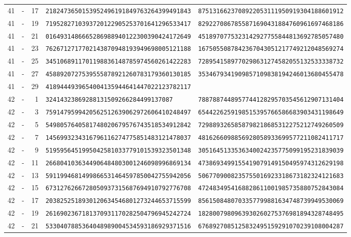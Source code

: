\begin{longtable}{@{}rcrll@{}}
41&-&17&\texttt{2182473650153952496191849763264399491843}&\texttt{8751316623708922053111950919304188601912}\\
41&-&19&\texttt{7195282710393720122905253701641296533417}&\texttt{8292270867855871690431884760961697468186}\\
41&-&21&\texttt{0164931486665286988940122300390424172649}&\texttt{4518970775323142927755844813692785057480}\\
41&-&23&\texttt{7626712717702143870948193949698005121188}&\texttt{1675055087842367043051217749212048569274}\\
41&-&25&\texttt{3451068911701198836148785974560261422283}&\texttt{7289541589770298631274582055132533338732}\\
41&-&27&\texttt{4588920727539555878921260783179360130185}&\texttt{3534679341909857109838194246013680455478}\\
41&-&29&\texttt{4189444939654004135944641447022123782117}&\texttt{}\\
42&-&1&\texttt{32414323869288131509266284499137087}&\texttt{7887887448957744128295703545612907131404}\\
42&-&3&\texttt{7591479599420562512639062972606410248497}&\texttt{6544226259198515395766586683903431198649}\\
42&-&5&\texttt{5498057640581748020679576743518534912842}&\texttt{7298893265858798218685312275212749260509}\\
42&-&7&\texttt{1456993234316796116274775851483121478037}&\texttt{4816266098856928058933699577211082411717}\\
42&-&9&\texttt{5195956451995042581033779101539323501348}&\texttt{3051645133536340024235775099195231839039}\\
42&-&11&\texttt{2668041036344906484803001246098996869134}&\texttt{4738693499155419079149150495974312629198}\\
42&-&13&\texttt{5911994681499866531464597850042755942056}&\texttt{5067709008235755016923318673182324121683}\\
42&-&15&\texttt{6731276266728050937315687694910792776708}&\texttt{4724834954168828611001985735880752843084}\\
42&-&17&\texttt{2038252518930120634546801273244653715599}&\texttt{8561508480703357799881634748739949530069}\\
42&-&19&\texttt{2616902367181370931170282504796945242724}&\texttt{1828007980963930260275376981894328748495}\\
42&-&21&\texttt{5330407885364048989004534593186929371516}&\texttt{6768927085125832495159291070239108004287}\\

\end{longtable}
